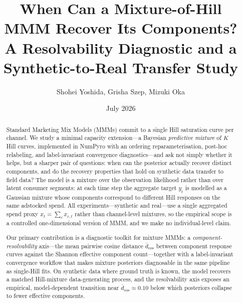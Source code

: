 \documentclass[11pt]{article}
\title{When Can a Mixture-of-Hill MMM Recover Its Components?\\
A Resolvability Diagnostic and a Synthetic-to-Real Transfer Study}
\author{Shohei Yoshida, Grisha Szep, Mizuki Oka}
\date{July 2026}
\begin{document}
\maketitle

\begin{abstract}
Standard Marketing Mix Models (MMMs) commit to a single Hill saturation curve per channel. We study a minimal capacity extension---a Bayesian \emph{predictive mixture} of $K$ Hill curves, implemented in NumPyro with an ordering reparameterisation, post-hoc relabeling, and label-invariant convergence diagnostics---and ask not simply whether it helps, but a sharper pair of questions: when can the posterior actually recover distinct components, and do the recovery properties that hold on synthetic data transfer to field data? The model is a mixture over the observation likelihood rather than over latent consumer segments: at each time step the aggregate target $y_t$ is modelled as a Gaussian mixture whose components correspond to different Hill responses on the same adstocked spend. All experiments---synthetic and real---use a single aggregated spend proxy $x_t = \sum_c x_{c,t}$ rather than channel-level mixtures, so the empirical scope is a controlled one-dimensional version of MMM, and we make no individual-level claim.

Our primary contribution is a diagnostic toolkit for mixture MMMs: a \emph{component-resolvability} axis---the mean pairwise cosine distance $\bar{d}_{\cos}$ between component response curves against the Shannon effective component count---together with a label-invariant convergence workflow that makes mixture posteriors diagnosable in the same pipeline as single-Hill fits. On synthetic data where ground truth is known, the model recovers a matched Hill-mixture data-generating process, and the resolvability axis exposes an empirical, model-dependent transition near $\bar{d}_{\cos} \approx 0.10$ below which posteriors collapse to fewer effective components.


\end{abstract}
\end{document}
